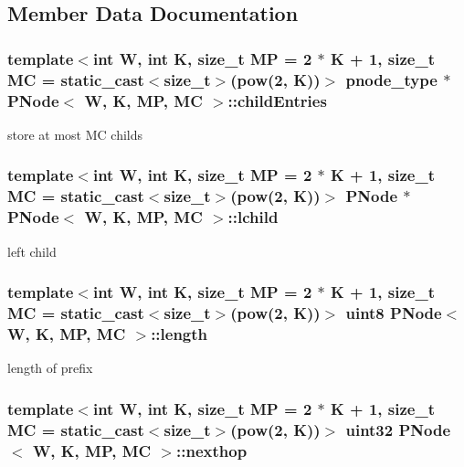 \subsection{Member Data Documentation}
\hypertarget{structPNode_abd7d00e0bc8cf69aa4911370670cd8f5}{
\subsubsection[{child\-Entries}]{\setlength{\rightskip}{0pt plus 5cm}template$<$int W, int K, size\-\_\-t M\-P = 2 $\ast$ K + 1, size\-\_\-t M\-C = static\-\_\-cast$<$size\-\_\-t$>$(pow(2, K))$>$ {\bf pnode\-\_\-type} $\ast$ {\bf P\-Node}$<$ {\bf W}, K, M\-P, M\-C $>$\-::child\-Entries}}\label{structPNode_abd7d00e0bc8cf69aa4911370670cd8f5}


store at most M\-C childs 

\hypertarget{structPNode_a14ee4a20bc0ab9644fb2ef69d0dfc22c}{
\subsubsection[{lchild}]{\setlength{\rightskip}{0pt plus 5cm}template$<$int W, int K, size\-\_\-t M\-P = 2 $\ast$ K + 1, size\-\_\-t M\-C = static\-\_\-cast$<$size\-\_\-t$>$(pow(2, K))$>$ {\bf P\-Node} $\ast$ {\bf P\-Node}$<$ {\bf W}, K, M\-P, M\-C $>$\-::lchild}}\label{structPNode_a14ee4a20bc0ab9644fb2ef69d0dfc22c}


left child 

\hypertarget{structPNode_a232325e635212db779b726f16959f238}{
\subsubsection[{length}]{\setlength{\rightskip}{0pt plus 5cm}template$<$int W, int K, size\-\_\-t M\-P = 2 $\ast$ K + 1, size\-\_\-t M\-C = static\-\_\-cast$<$size\-\_\-t$>$(pow(2, K))$>$ {\bf uint8} {\bf P\-Node}$<$ {\bf W}, K, M\-P, M\-C $>$\-::length}}\label{structPNode_a232325e635212db779b726f16959f238}


length of prefix 

\hypertarget{structPNode_a605054fd7e6a758e489ccfaaf71dcbc3}{
\subsubsection[{nexthop}]{\setlength{\rightskip}{0pt plus 5cm}template$<$int W, int K, size\-\_\-t M\-P = 2 $\ast$ K + 1, size\-\_\-t M\-C = static\-\_\-cast$<$size\-\_\-t$>$(pow(2, K))$>$ {\bf uint32} {\bf P\-Node}$<$ {\bf W}, K, M\-P, M\-C $>$\-::nexthop}}\label{structPNode_a605054fd7e6a758e489ccfaaf71dcbc3}


